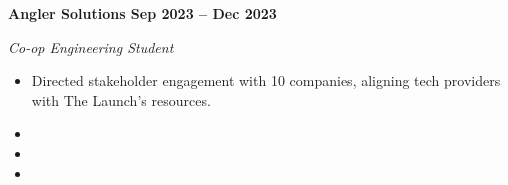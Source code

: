 \vspace{0.1cm}
\textbf{Angler Solutions \hfill Sep 2023 -- Dec 2023} \par
\textit{Co-op Engineering Student} \par
\begin{itemize}
	\item Directed stakeholder engagement with 10 companies, aligning tech providers with The Launch’s resources.
  \item 
  \item 
  \item 
\end{itemize} \par